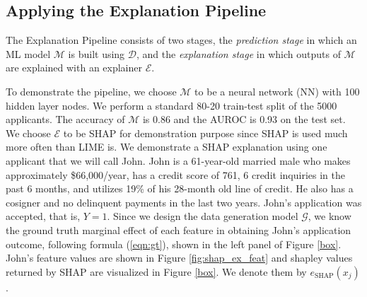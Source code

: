 \documentclass[mnsc,blindrev]{informs3}
\begin{document}
\subsection{Applying the Explanation Pipeline}
\label{sec:applying_to_simulated}
The Explanation Pipeline consists of two stages, the \emph{prediction stage} in which an ML model $\mathcal{M}$ is built using $\mathcal{D}$, and the \emph{explanation stage} in which outputs of $\mathcal{M}$ are explained with an explainer $\mathcal{E}$. 

To demonstrate the pipeline, we choose $\mathcal{M}$ to be a neural network (NN) with 100 hidden layer nodes. We perform a standard 80-20 train-test split of the 5000 applicants. The accuracy of $\mathcal{M}$ is 0.86 and the AUROC is 0.93 on the test set. We choose $\mathcal{E}$ to be SHAP for demonstration purpose since SHAP is used much more often than LIME is. %
We demonstrate a SHAP explanation using one applicant that we will call John. John is a 61-year-old married male who makes approximately \$66,000/year, has a credit score of 761, 6 credit inquiries in the past 6 months, and utilizes 19\% of his 28-month old line of credit. He also has a cosigner and no delinquent payments in the last two years. John's application was accepted, that is, $Y = 1$. Since we design the data generation model $\mathcal{G}$, we know the ground truth marginal effect of each feature in obtaining John's application outcome, following formula (\ref{eqn:gt}), shown in the left panel of Figure \ref{box}. John's feature values are shown in Figure \ref{fig:shap_ex_feat} and shapley values returned by SHAP  are visualized in Figure \ref{box}. We denote them by $e_\text{SHAP}(x_j)$. %
\end{document}
